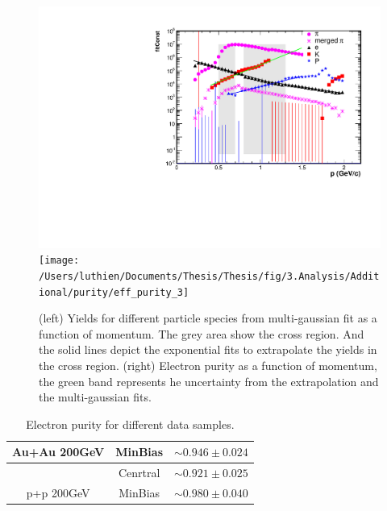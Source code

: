 \begin{figure}
\begin{centering}
\includegraphics[angle=270,scale=0.35]{fig/3.Analysis/Additional/purity/const3}\texttt{[image: /Users/luthien/Documents/Thesis/Thesis/fig/3.Analysis/Additional/purity/eff\_purity\_3]}
\par\end{centering}

\protect\caption{(left) Yields for different particle species from multi-gaussian fit
as a function of momentum. The grey area show the cross region. And
the solid lines depict the exponential fits to extrapolate the yields
in the cross region. (right) Electron purity as a function of momentum,
the green band represents he uncertainty from the extrapolation and
the multi-gaussian fits.}


\label{fig:yield and purity}
\end{figure}

\begin{lyxcode}
\begin{table}
\begin{centering}
\begin{tabular}{c|c|c}
\hline 
Au+Au 200GeV & MinBias & $\sim0.946\pm0.024$\tabularnewline
\hline 
 & Cenrtral & $\sim0.921\pm0.025$\tabularnewline
\hline 
p+p 200GeV & MinBias & $\sim0.980\pm0.040$\tabularnewline
\hline 
\end{tabular}
\par\end{centering}

\protect\caption{Electron purity for different data samples.}


\label{Table:purity}

\end{table}

\end{lyxcode}

